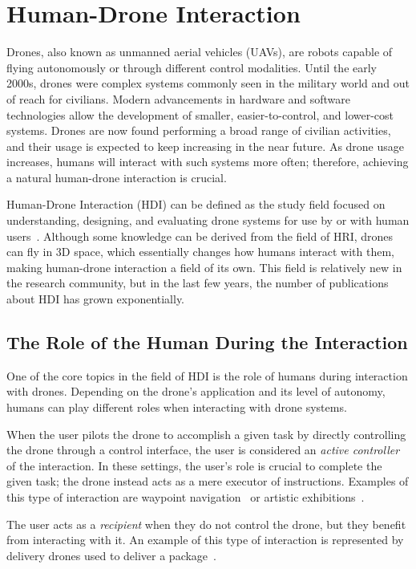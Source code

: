 \section{Human-Drone Interaction}\label{sec:soa_hdi}
Drones, also known as unmanned aerial vehicles (UAVs), are robots capable of flying autonomously or through different control modalities.
Until the early 2000s, drones were complex systems commonly seen in the military world and out of reach for civilians. 
Modern advancements in hardware and software technologies allow the development of smaller, easier-to-control, and lower-cost systems.
Drones are now found performing a broad range of civilian activities, and their usage is expected to keep increasing in the near future.
As drone usage increases, humans will interact with such systems more often; therefore, achieving a natural human-drone interaction is crucial.

Human-Drone Interaction (HDI) can be defined as the study field focused on understanding, designing, and evaluating drone systems 
for use by or with human users~\cite{tezza2019hdi}. Although some knowledge can be derived from the field of HRI, 
drones can fly in 3D space, which essentially changes how humans interact with them, making human-drone interaction a field of its own.
This field is relatively new in the research community, but in the last few years, the number of publications about HDI has grown exponentially.

\subsection{The Role of the Human During the Interaction}\label{subsec:hdi_interacction_role}
One of the core topics in the field of HDI is the role of humans during interaction with drones.
Depending on the drone's application and its level of autonomy, humans can play different roles when interacting with drone systems.

When the user pilots the drone to accomplish a given task by directly controlling the drone through a control interface, 
the user is considered an \textit{active controller} of the interaction. In these settings, the user's role is crucial to complete the given task; the drone instead acts as a mere executor of instructions. 
Examples of this type of interaction are waypoint navigation~\cite{hoppe2019droneOS} or artistic exhibitions~\cite{eriksson2020ethicsInMovement}.

The user acts as a \textit{recipient} when they do not control the drone, but they benefit from interacting with it. 
An example of this type of interaction is represented by delivery drones used to deliver a package~\cite{singireddy2018primeAir,hoppe2019droneOS, wingDrones}.

